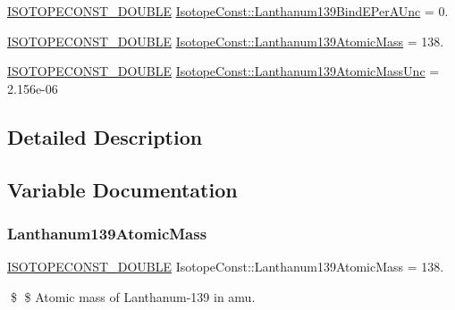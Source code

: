 \begin{DoxyCompactItemize}
\mbox{\hyperlink{group___isotope_const-_macros_ga8f45a7272ce02c0b4c65c44636ed719a}{I\+S\+O\+T\+O\+P\+E\+C\+O\+N\+S\+T\+\_\+\+D\+O\+U\+B\+LE}} \mbox{\hyperlink{group___isotope_const-_lanthanum-_la139_ga47d7f6dcc849d7ef64525c96476e54f1}{Isotope\+Const\+::\+Lanthanum139\+Bind\+E\+Per\+A\+Unc}} = 0.
\item 
\mbox{\hyperlink{group___isotope_const-_macros_ga8f45a7272ce02c0b4c65c44636ed719a}{I\+S\+O\+T\+O\+P\+E\+C\+O\+N\+S\+T\+\_\+\+D\+O\+U\+B\+LE}} \mbox{\hyperlink{group___isotope_const-_lanthanum-_la139_ga37a163aed0c10187f79200a6685dc817}{Isotope\+Const\+::\+Lanthanum139\+Atomic\+Mass}} = 138.
\item 
\mbox{\hyperlink{group___isotope_const-_macros_ga8f45a7272ce02c0b4c65c44636ed719a}{I\+S\+O\+T\+O\+P\+E\+C\+O\+N\+S\+T\+\_\+\+D\+O\+U\+B\+LE}} \mbox{\hyperlink{group___isotope_const-_lanthanum-_la139_ga4cbfc368dc13233b1cded844f29ad1b0}{Isotope\+Const\+::\+Lanthanum139\+Atomic\+Mass\+Unc}} = 2.\+156e-\/06
\end{DoxyCompactItemize}


\subsection{Detailed Description}


\subsection{Variable Documentation}
\mbox{\label{group___isotope_const-_lanthanum-_la139_ga37a163aed0c10187f79200a6685dc817}} 
\subsubsection{\texorpdfstring{Lanthanum139\+Atomic\+Mass}{Lanthanum139AtomicMass}}
{\footnotesize\ttfamily \mbox{\hyperlink{group___isotope_const-_macros_ga8f45a7272ce02c0b4c65c44636ed719a}{I\+S\+O\+T\+O\+P\+E\+C\+O\+N\+S\+T\+\_\+\+D\+O\+U\+B\+LE}} Isotope\+Const\+::\+Lanthanum139\+Atomic\+Mass = 138.}

\$ \$ Atomic mass of Lanthanum-\/139 in amu. \mbox{\label{group___isotope_const-_lanthanum-_la139_ga4cbfc368dc13233b1cded844f29ad1b0}} 
